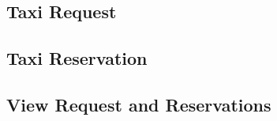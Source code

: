 \subsection{Taxi Request}

\subsection{Taxi Reservation}

\subsection{View Request and Reservations}
